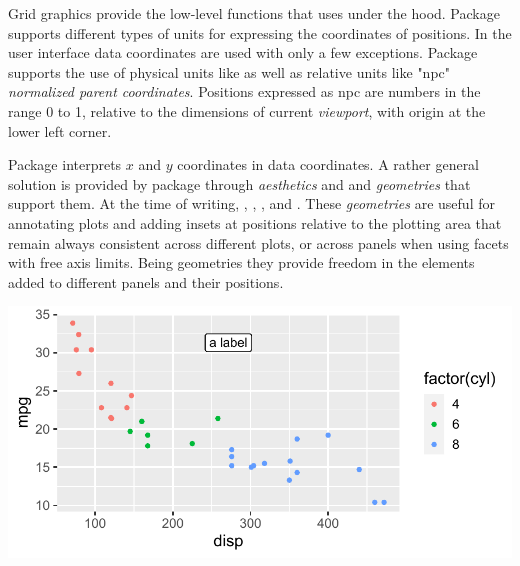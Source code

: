 \documentclass[krantz2]{krantz}\usepackage{knitr}
\begin{document}
\begin{explainbox}
Grid graphics provide the low-level functions that  uses under the hood. Package  supports different types of units for expressing the coordinates of positions. In the  user interface  data coordinates are used with only a few exceptions. Package  supports the use of physical units like  as well as relative units like "npc" \emph{normalized parent coordinates}. Positions expressed as npc are numbers in the range 0 to 1, relative to the dimensions of current \emph{viewport}, with origin at the lower left corner.

Package  interprets $x$ and $y$ coordinates in  data coordinates. A rather general solution is provided by package  through \emph{aesthetics}  and  and \emph{geometries} that support them. At the time of writing, , , ,  and . These \emph{geometries} are useful for annotating plots and adding insets at positions relative to the plotting area that remain always consistent across different plots, or across panels when using facets with free axis limits. Being geometries they provide freedom in the elements added to different panels and their positions.

\begin{knitrout}\footnotesize
{}\color{fgcolor}\begin{kframe}
\begin{alltt}
\hlstd{(} 
        \hlstd{=} \hlstd{(}     \hlstd{=}  \hlopt{+}
  \hlstd{()} \hlopt{+}
  \hlstd{(} \hlstd{=} \hlstd{,}  \hlstd{=} \hlstd{,}  \hlstd{=} \hlstd{,}  \hlstd{=} \hlstd{)}
\end{alltt}
\end{kframe}

{\centering \includegraphics[width=.7\textwidth]{figure/pos-plot-npc-eb-01-1} 

}


\end{knitrout}

\end{explainbox}
\end{document}
